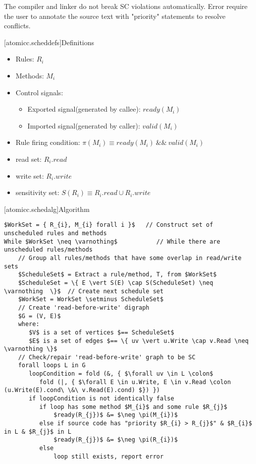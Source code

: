 The compiler and linker do not break SC violations automatically. Error require the user to annotate
the source text with "priority" statements to resolve conflicts.

[atomicc.scheddefs]{Definitions}
\begin{itemize}
\item Rules: $R_{i}$
\item Methods: $M_{i}$
\item Control signals:
\begin {itemize}
\item Exported signal(generated by callee):  $ready(M_{i})$
\item Imported signal(generated by caller):  $valid(M_{i})$
\end{itemize}
\item Rule firing condition: $\pi(M_{i}) \equiv ready(M_{i})\ \&\&\ valid(M_{i})$
\item read set: $R_{i}.read$
\item write set: $R_{i}.write$
\item sensitivity set: $S(R_{i}) \equiv R_{i}.read \cup R_{i}.write$
\end{itemize}
[atomicc.schedalg]{Algorithm}

\begin{lstlisting}[mathescape=true]
$WorkSet = { R_{i}, M_{i} forall i }$   // Construct set of unscheduled rules and methods
While $WorkSet \neq \varnothing$           // While there are unscheduled rules/methods
    // Group all rules/methods that have some overlap in read/write sets
    $ScheduleSet$ = Extract a rule/method, T, from $WorkSet$
    $ScheduleSet = \{ E \vert S(E) \cap S(ScheduleSet) \neq \varnothing  \}$  // Create next schedule set
    $WorkSet = WorkSet \setminus ScheduleSet$
    // Create 'read-before-write' digraph
    $G = (V, E)$
    where: 
       $V$ is a set of vertices $== ScheduleSet$
       $E$ is a set of edges $== \{ uv \vert u.Write \cap v.Read \neq \varnothing \}$
    // Check/repair 'read-before-write' graph to be SC
    forall loops L in G
       loopCondition = fold (&, { $\forall uv \in L \colon$
          fold (|, { $\forall E \in u.Write, E \in v.Read \colon (u.Write(E).cond\ \&\ v.Read(E).cond) $}) })
       if loopCondition is not identically false
          if loop has some method $M_{i}$ and some rule $R_{j}$
              $ready(R_{j})$ &= $\neg \pi(M_{i})$
          else if source code has "priority $R_{i} > R_{j}$" & $R_{i}$ in L & $R_{j}$ in L
              $ready(R_{j})$ &= $\neg \pi(R_{i})$
          else
              loop still exists, report error
\end{lstlisting}


